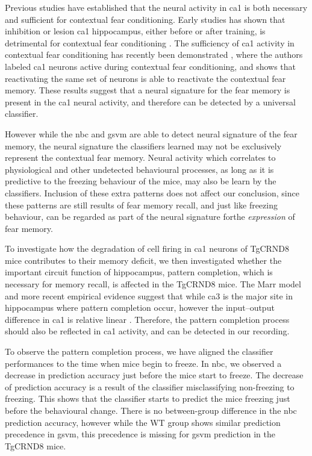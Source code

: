 Previous studies have established that the neural activity in \gls{ca1} is both necessary and sufficient for contextual fear conditioning. Early studies has shown that inhibition or lesion \gls{ca1} hippocampus, either before or after training, is detrimental for contextual fear conditioning \citep{maren01}. The sufficiency of \gls{ca1} activity in contextual fear conditioning has recently been demonstrated \citep{ryan15, roy16}, where the authors labeled \gls{ca1} neurons active during contextual fear conditioning, and shows that reactivating the same set of neurons is able to reactivate the contextual fear memory. These results suggest that a neural signature for the fear memory is present in the \gls{ca1} neural activity, and therefore can be detected by a universal classifier. 

However while the \gls{nbc} and \gls{gsvm} are able to detect neural signature of the fear memory, the neural signature the classifiers learned may not be exclusively represent the contextual fear memory. Neural activity which correlates to physiological and other undetected behavioural processes, as long as it is predictive to the freezing behaviour of the mice, may also be learn by the classifiers. Inclusion of these extra patterns does not affect our conclusion, since these patterns are still results of fear memory recall, and just like freezing behaviour, can be regarded as part of the neural signature forthe \textit{expression} of fear memory. 

To investigate how the degradation of cell firing in \gls{ca1} neurons of TgCRND8 mice contributes to their memory deficit, we then investigated whether the important circuit function of hippocampus, pattern completion, which is necessary for memory recall, is affected in the TgCRND8 mice. The Marr model and more recent empirical evidence \citep{rolls13, neunuebel14} suggest that while \gls{ca3} is the major site in hippocampus where pattern completion occur, however the input--output difference in \gls{ca1} is relative linear \citep{neunuebel14, knierim16}. Therefore, the pattern completion process should also be reflected in \gls{ca1} activity, and can be detected in our recording.

To observe the pattern completion process, we have aligned the classifier performances to the time when mice begin to freeze. In \gls{nbc}, we observed a decrease in prediction accuracy just before the mice start to freeze. The decrease of prediction accuracy is a result of the classifier misclassifying non-freezing to freezing. This shows that the classifier starts to predict the mice freezing just before the behavioural change. There is no between-group difference in the \gls{nbc} prediction accuracy, however while the WT group shows similar prediction precedence in \gls{gsvm}, this precedence is missing for \gls{gsvm} prediction in the TgCRND8 mice. 

